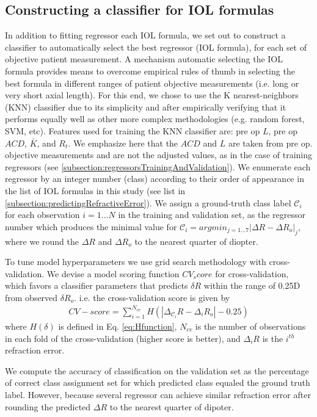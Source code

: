 \documentclass[article,twocolumn,preprint,10pt]{paper}%
\renewcommand{\(}{\left(}
\renewcommand{\)}{\right)}
\renewcommand{\[}{\left[}
\renewcommand{\]}{\right]}
\newcommand{\ds}{\displaystyle}
\newcommand{\beq}{\begin{eqnarray}}
\newcommand{\eeq}{\end{eqnarray}}
\newcommand{\1}{\mbox{\boldmath$1$}}
\begin{document}
\subsection{Constructing a classifier for IOL formulas}\label{subsection:ClassificationOfIOLFormulas}
In addition to fitting regressor each IOL formula, we set out to construct a classifier to automatically select the best regressor (IOL formula), for each set of objective patient measurement. A mechanism automatic selecting the IOL formula provides means to overcome empirical rules of thumb in selecting the best formula in different ranges of patient objective measurements (i.e. long or very short axial length). For this end, we chose to use the K nearest-neighbors (KNN) classifier  due to its simplicity and after empirically verifying that it performs equally well as other more complex methodologies (e.g. random forest, SVM, etc).
Features used for training the KNN classifier are: pre op $L$, pre op $ACD$, $\bar{K}$, and $R_t$. We emphasize here that the $ACD$ and $L$ are taken from pre op. objective measurements and are not the adjusted values, as in the case of training regressors (see \ref{subsection:regressorsTrainingAndValidation}).
We enumerate each regressor by an integer number (class) according to their order of appearance in the list of IOL formulas in this study (see list in \ref{subsection:predictingRefractiveError}). We assign a ground-truth class label $\mathcal{C}_i$ for each observation $i=1\ldots N$ in the training and validation set, as the regressor number which produces the minimal value for $\ds \mathcal{C}_i =  argmin_{j=1\ldots 7} |\Delta R-\Delta R_o|_j$, where we round the $\Delta R$ and $\Delta R_o$ to the nearest quarter of diopter.

To tune model hyperparameters we use grid search methodology with cross-validation. We devise a model scoring function $CV_score$ for cross-validation, which favors a classifier parameters that predicts $\delta R$ within the range of 0.25D from observed $\delta R_o$.  i.e. the cross-validation score is given by 
\beq 
CV-score = \sum_{i=1}^{N_{cv}}H(|\Delta_{\mathcal{C}_i} R - \Delta_i R_o|-0.25)
\eeq 
where $H(\delta)$ is defined in Eq. \ref{eq:Hfunction},  $N_{cv}$ is the number of observations in each fold of the cross-validation (higher score is better), and $\Delta_i R$ is the $i^{th}$ refraction error.
 
We compute the accuracy of classification on the validation set as the percentage of correct class assignment set for which predicted class equaled the ground truth label. However, because several regressor can achieve similar refraction error after rounding the predicted $\Delta R$ to the nearest quarter of dipoter.
\end{document}
